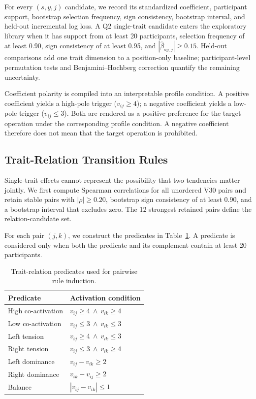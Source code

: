 For every $(s,y,j)$ candidate, we record its standardized coefficient, participant support, bootstrap selection frequency, sign consistency, bootstrap interval, and held-out incremental log loss. A Q2 single-trait candidate enters the exploratory library when it has support from at least 20 participants, selection frequency of at least 0.90, sign consistency of at least 0.95, and $|\hat\beta_{sy,j}|\ge0.15$. Held-out comparisons add one trait dimension to a position-only baseline; participant-level permutation tests and Benjamini--Hochberg correction quantify the remaining uncertainty.

Coefficient polarity is compiled into an interpretable profile condition. A positive coefficient yields a high-pole trigger ($v_{ij}\ge4$); a negative coefficient yields a low-pole trigger ($v_{ij}\le3$). Both are rendered as a positive preference for the target operation under the corresponding profile condition. A negative coefficient therefore does not mean that the target operation is prohibited.

\subsection{Trait-Relation Transition Rules}

Single-trait effects cannot represent the possibility that two tendencies matter jointly. We first compute Spearman correlations for all unordered V30 pairs and retain stable pairs with $|\rho|\ge0.20$, bootstrap sign consistency of at least 0.90, and a bootstrap interval that excludes zero. The 12 strongest retained pairs define the relation-candidate set.

For each pair $(j,k)$, we construct the predicates in Table~\ref{tab:app_trait_predicates}. A predicate is considered only when both the predicate and its complement contain at least 20 participants.

\begin{table}[t]
\centering
\small
\caption{Trait-relation predicates used for pairwise rule induction.}
\label{tab:app_trait_predicates}
\begin{tabular}{ll}
\toprule
\textbf{Predicate} & \textbf{Activation condition} \\
\midrule
High co-activation & $v_{ij}\ge4\ \land\ v_{ik}\ge4$ \\
Low co-activation & $v_{ij}\le3\ \land\ v_{ik}\le3$ \\
Left tension & $v_{ij}\ge4\ \land\ v_{ik}\le3$ \\
Right tension & $v_{ij}\le3\ \land\ v_{ik}\ge4$ \\
Left dominance & $v_{ij}-v_{ik}\ge2$ \\
Right dominance & $v_{ik}-v_{ij}\ge2$ \\
Balance & $|v_{ij}-v_{ik}|\le1$ \\
\bottomrule
\end{tabular}
\end{table}

